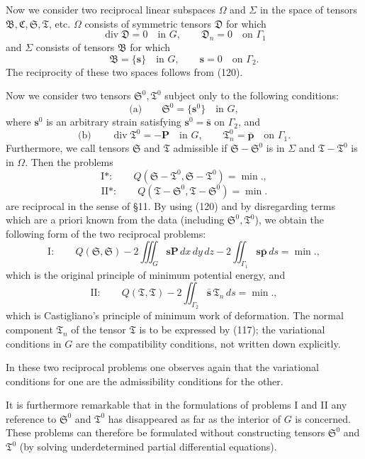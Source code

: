Now we consider two reciprocal linear subspaces $\Omega$ and $\Sigma$ in the space of tensors $\mathfrak B,\mathfrak C,\mathfrak S,\mathfrak T$, etc. $\Omega$ consists of symmetric tensors $\mathfrak D$ for which
\[
\operatorname{div}\mathfrak D=0\quad\text{in }G,\qquad \mathfrak D_n=0\quad\text{on }\Gamma_1
\]
and $\Sigma$ consists of tensors $\mathfrak B$ for which
\[
\mathfrak B=\{\mathbf s\}\quad\text{in }G,\qquad \mathbf s=0\quad\text{on }\Gamma_2.
\]
The reciprocity of these two spaces follows from (120).

Now we consider two tensors $\mathfrak S^0,\mathfrak T^0$ subject only to the following conditions:
\[
\text{(a)}\qquad \mathfrak S^0=\{\mathbf s^0\}\quad\text{in }G,
\]
where $\mathbf s^0$ is an arbitrary strain satisfying $\mathbf s^0=\bar{\mathbf s}$ on $\Gamma_2$, and
\[
\text{(b)}\qquad \operatorname{div}\mathfrak T^0=-\mathbf P\quad\text{in }G,\qquad \mathfrak T_n^0=\bar{\mathbf p}\quad\text{on }\Gamma_1.
\]
Furthermore, we call tensors $\mathfrak S$ and $\mathfrak T$ admissible if $\mathfrak S-\mathfrak S^0$ is in $\Sigma$ and $\mathfrak T-\mathfrak T^0$ is in $\Omega$. Then the problems
\[
\text{I*}:\qquad Q(\mathfrak S-\mathfrak T^0,\mathfrak S-\mathfrak T^0)=\min.,
\]
\[
\text{II*}:\qquad Q(\mathfrak T-\mathfrak S^0,\mathfrak T-\mathfrak S^0)=\min.
\]
are reciprocal in the sense of \S11. By using (120) and by disregarding terms which are a priori known from the data (including $\mathfrak S^0,\mathfrak T^0$), we obtain the following form of the two reciprocal problems:
\[
\text{I}:\qquad Q(\mathfrak S,\mathfrak S)-2\iiint_G\mathbf s\mathbf P\,dx\,dy\,dz-2\iint_{\Gamma_1}\mathbf s\bar{\mathbf p}\,ds=\min.,
\]
which is the original principle of minimum potential energy, and
\[
\text{II}:\qquad Q(\mathfrak T,\mathfrak T)-2\iint_{\Gamma_2}\bar{\mathbf s}\,\mathfrak T_n\,ds=\min.,
\]
which is Castigliano's principle of minimum work of deformation. The normal component $\mathfrak T_n$ of the tensor $\mathfrak T$ is to be expressed by (117); the variational conditions in $G$ are the compatibility conditions, not written down explicitly.

In these two reciprocal problems one observes again that the variational conditions for one are the admissibility conditions for the other.

It is furthermore remarkable that in the formulations of problems I and II any reference to $\mathfrak S^0$ and $\mathfrak T^0$ has disappeared as far as the interior of $G$ is concerned. These problems can therefore be formulated without constructing tensors $\mathfrak S^0$ and $\mathfrak T^0$ (by solving underdetermined partial differential equations).

